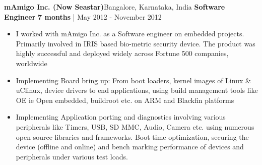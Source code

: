         \vspace{12pt}
    \textbf{mAmigo Inc. (Now Seastar)}\hfill{Bangalore, Karnataka, India}
    \newline
    \textbf{Software Engineer} \hfill{\textbf{7 months} | May 2012 - November 2012}
    \begin{itemize}
     
            \item {I worked with mAmigo Inc. as a Software engineer on embedded projects. Primarily involved in IRIS based bio-metric security device. The product was highly successful and deployed widely across Fortune 500 companies, worldwide}
            \item {Implementing Board bring up: From boot loaders, kernel images of Linux \& uClinux, device drivers to end applications, using build management tools like OE ie Open embedded, buildroot etc. on ARM and Blackfin platforms}
            \item {Implementing Application porting and diagnostics involving various peripherals like Timers, USB, SD MMC, Audio, Camera etc. using numerous open source libraries and frameworks. Boot time optimization, securing the device (offline and online) and bench marking performance of devices and peripherals under various test loads.}
            
    \end{itemize}
    \vspace{12pt}
%


